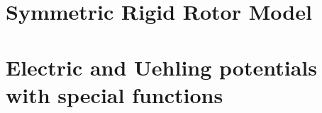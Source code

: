 \documentclass  [
  paper           = a4,
  BCOR            = 13mm, %
  twoside,
  fontsize        = 11pt, %
  DIV             = 12,   %
  chapterprefix,
  numbers         = noendperiod,
  headinclude     = true,
  footinclude     = false,
  headings        = big,
  headings        = openright,
  headsepline     = true,
  footsepline     = false,
  cleardoublepage = empty,
  titlepage       = true
]                                       {scrbook}
\begin{document}
  \chapter{Symmetric Rigid Rotor Model}
    
      
  \chapter{Electric and Uehling potentials with special functions \label{app:pots}}    
    




  \cleardoublepage
  \backmatter

  
    
%    
%    
    \thispagestyle{plain}





  \cleardoublepage

  
    \thispagestyle{plain}


%  


%    
%    
\end{document}
